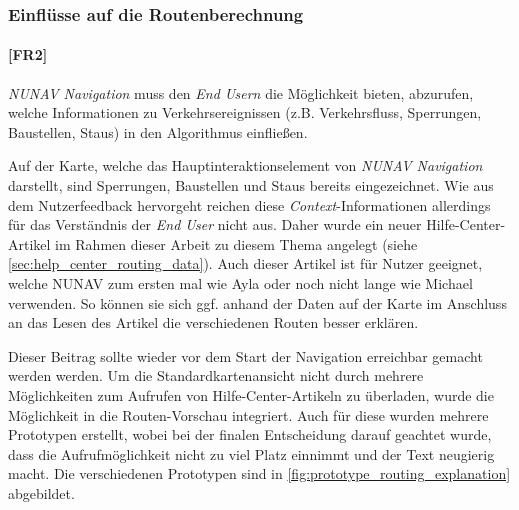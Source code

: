 \subsubsection{Einflüsse auf die Routenberechnung}
\label{sec:route_explanation_definition}

\paragraph{[FR2]} \textit{NUNAV Navigation} muss den \textit{End Usern} die Möglichkeit bieten, abzurufen, welche Informationen zu Verkehrsereignissen (z.B. Verkehrsfluss, Sperrungen, Baustellen, Staus) in den Algorithmus einfließen.

\bigskip

Auf der Karte, welche das Hauptinteraktionselement von \textit{NUNAV Navigation} darstellt, sind Sperrungen, Baustellen und Staus bereits eingezeichnet. Wie aus dem Nutzerfeedback hervorgeht reichen diese \textit{Context}-Informationen allerdings für das Verständnis der \textit{End User} nicht aus. Daher wurde ein neuer Hilfe-Center-Artikel im Rahmen dieser Arbeit zu diesem Thema angelegt (siehe \autoref{sec:help_center_routing_data}). Auch dieser Artikel ist für Nutzer geeignet, welche NUNAV zum ersten mal wie Ayla oder noch nicht lange wie Michael verwenden. So können sie sich ggf. anhand der Daten auf der Karte im Anschluss an das Lesen des Artikel die verschiedenen Routen besser erklären. 

Dieser Beitrag sollte wieder vor dem Start der Navigation erreichbar gemacht werden werden. Um die Standardkartenansicht nicht durch mehrere Möglichkeiten zum Aufrufen von Hilfe-Center-Artikeln zu überladen, wurde die Möglichkeit in die Routen-Vorschau integriert. Auch für diese wurden mehrere Prototypen erstellt, wobei bei der finalen Entscheidung darauf geachtet wurde, dass die Aufrufmöglichkeit nicht zu viel Platz einnimmt und der Text neugierig macht. Die verschiedenen Prototypen sind in \autoref{fig:prototype_routing_explanation} abgebildet.

